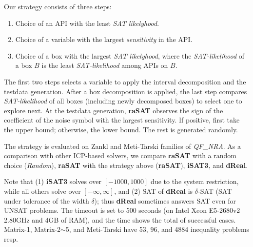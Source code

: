 \documentclass[runningheads,a4paper,oribibl]{llncs}
\begin{document}
Our strategy consists of three steps:
\begin{enumerate}
\item Choice of an API with the least {\em SAT likelyhood}.
\item Choice of a variable with the largest {\em sensitivity} in the API.
\item Choice of a box with the largest {\em SAT likelyhood}, where
the {\em SAT-likelihood} of a box $B$ is the least {\em SAT-likelihood} among APIs on $B$.
\end{enumerate}
The first two steps selects a variable to apply the interval decomposition and
the testdata generation. After a box decomposition is applied, the last step
compares {\em SAT-likelihood} of all boxes (including newly decomposed boxes)
to select one to explore next. 
%
At the testdata generation, 
{\bf raSAT} observes the sign of the coefficient of the noise symbol with the largest
sensitivity. 
If positive, first take the upper bound; %
otherwise, the lower bound. The rest is generated randomly. 

The strategy is evaluated on Zankl and Meti-Tarski families of \emph{QF\_NRA}.
As a comparison with other ICP-based solvers, we compare
{\bf raSAT} with a random choice ({\em Random}), {\bf raSAT} with the strategy above
({\bf raSAT}), {\bf iSAT3}, and {\bf dReal}.

Note that (1) {\bf iSAT3} solves over $[-1000,1000]$ due to the system restriction,
while all others solve over $[-\infty, \infty]$, and (2) SAT of {\bf dReal} is 
$\delta$-SAT (SAT under tolerance of the width $\delta$); thus {\bf dReal} sometimes
answers SAT even for UNSAT problems. 
The timeout is set to 500 seconds (on Intel Xeon E5-2680v2 2.80GHz and 4GB of RAM), 
and the time shows the total of successful cases. 
Matrix-1, Matrix-2$\sim$5, and Meti-Tarski have 53, 96, and 4884 inequality problems resp. 
\end{document}
